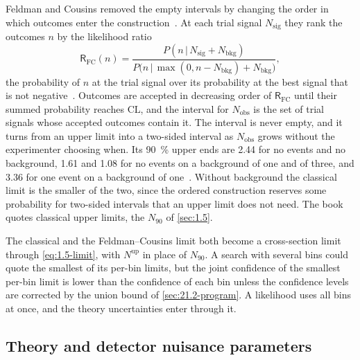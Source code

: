 Feldman and Cousins removed the empty intervals by changing the order in which outcomes enter the construction~\cite[Sect.~IV\,A]{feldman1998unified}. At each trial signal $N_{\mathrm{sig}}$ they rank the outcomes $n$ by the likelihood ratio
\begin{equation}
  \mathsf{R}_{\mathrm{FC}}(n) = \frac{P(n\,|\,N_{\mathrm{sig}} + N_{\mathrm{bkg}})}{P\bigl(n\,|\,\max(0, n - N_{\mathrm{bkg}}) + N_{\mathrm{bkg}}\bigr)} ,
  \label{eq:21.4-fc}
\end{equation}
the probability of $n$ at the trial signal over its probability at the best signal that is not negative~\cite[Eq.~(4.1)]{feldman1998unified}. Outcomes are accepted in decreasing order of $\mathsf{R}_{\mathrm{FC}}$ until their summed probability reaches $\mathrm{CL}$, and the interval for $N_{\mathrm{obs}}$ is the set of trial signals whose accepted outcomes contain it. The interval is never empty, and it turns from an upper limit into a two-sided interval as $N_{\mathrm{obs}}$ grows without the experimenter choosing when. Its \SI{90}{\percent} upper ends are 2.44 for no events and no background, 1.61 and 1.08 for no events on a background of one and of three, and 3.36 for one event on a background of one~\cite[Table~IV]{feldman1998unified}. Without background the classical limit is the smaller of the two, since the ordered construction reserves some probability for two-sided intervals that an upper limit does not need. The book quotes classical upper limits, the $N_{90}$ of \cref{sec:1.5}.

The classical and the Feldman--Cousins limit both become a cross-section limit through \cref{eq:1.5-limit}, with $N^{\mathrm{up}}$ in place of $N_{90}$. A search with several bins could quote the smallest of its per-bin limits, but the joint confidence of the smallest per-bin limit is lower than the confidence of each bin unless the confidence levels are corrected by the union bound of \cref{sec:21.2-program}. A likelihood uses all bins at once, and the theory uncertainties enter through it.

\subsection{Theory and detector nuisance parameters}\label{sec:21.4-like}

